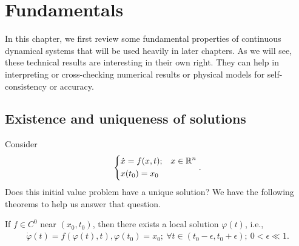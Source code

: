 \chapter{Fundamentals}
 In this chapter, we first review some fundamental properties of continuous dynamical systems that will be used heavily in later chapters. As we will see, these technical results are interesting in their own right. They can help in interpreting or cross-checking numerical results or physical models for self-consistency or accuracy.
\section{Existence and uniqueness of solutions}
Consider  
\begin{align}
\begin{dcases}
	\dot{x} = f(x,t); & x \in \mathbb{R}^{n} \\
	x(t_0) = x_0
\end{dcases}.
\end{align}
Does this initial value problem have a unique solution? We have the following theorems to help us answer that question.
\begin{theorem}[Peano]
	\label{thm:Peano}
	If $f\in C^0$ near $(x_0, t_0)$, then there exists a local solution $\varphi(t)$, i.e., 
\begin{align}
	\dot{\varphi}(t) = f(\varphi(t), t), \varphi(t_0) = x_0;\ \forall  t\in (t_0 - \epsilon, t_0 + \epsilon);\ 0<  \epsilon \ll 1.
\end{align}
\end{theorem}
